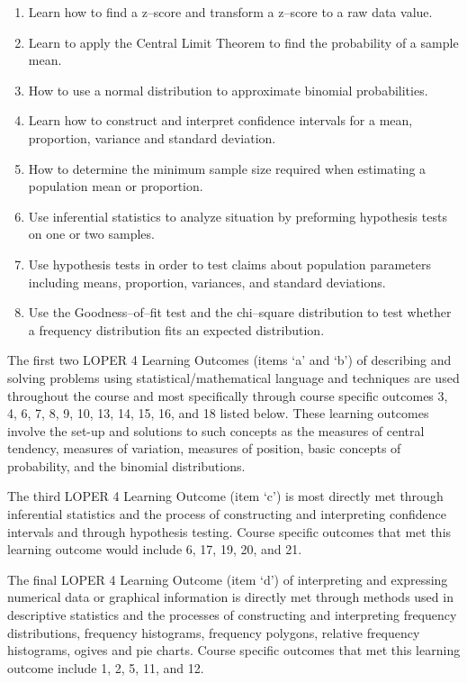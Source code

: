 \documentclass[11pt]{article}
\newenvironment{alphalist}{
\begin{enumerate}[label=(\arabic*),widest=107 ,leftmargin=25pt, itemsep=0pt]}
{\end{enumerate}}
\begin{document}
\begin{alphalist}
\item Learn how to find a z--score and transform a z--score to a 
raw data value.

\item Learn to apply the Central Limit Theorem to find the 
probability of a sample mean.

\item How to use a normal distribution to approximate binomial 
probabilities.

\item Learn how to construct and interpret confidence intervals 
for a mean, proportion,  variance and standard deviation.

\item How to determine the minimum sample size required when 
estimating a population mean  or proportion.

\item Use inferential statistics to analyze situation by preforming 
hypothesis tests on one or  two samples. 

\item Use hypothesis tests in order to test claims about population 
parameters including means,  proportion, variances, and standard 
deviations.

\item Use the Goodness--of--fit test and the chi--square 
distribution to test whether a frequency distribution fits an 
expected distribution.
 \end{alphalist}

 The first two LOPER 4 Learning Outcomes (items `a' and `b') of 
 describing and solving problems using statistical/mathematical 
 language and techniques are used throughout the course and most 
 specifically through course specific outcomes 3, 4, 6, 7, 8, 9, 
 10, 13, 14, 15, 16, and 18 listed below.  These learning outcomes 
 involve the set-up and solutions to such concepts as the measures 
 of central tendency, measures of variation, measures of position, 
 basic concepts of probability, and the binomial distributions.  

 

 The third LOPER 4 Learning Outcome (item `c') is most directly met 
 through inferential statistics and the process of constructing and 
 interpreting confidence intervals and through hypothesis testing. 
 Course specific outcomes that met this learning outcome would 
 include 6, 17, 19, 20, and 21. 
 
 The final LOPER 4 Learning Outcome (item `d') of interpreting and 
 expressing numerical data or graphical information is directly met 
 through methods used in descriptive statistics and the processes 
 of  constructing and interpreting frequency distributions, 
 frequency histograms, frequency polygons, relative frequency 
 histograms, ogives and pie charts.  Course specific outcomes 
 that met this learning outcome include 1, 2, 5, 11, and 12. 
  
\end{document}
